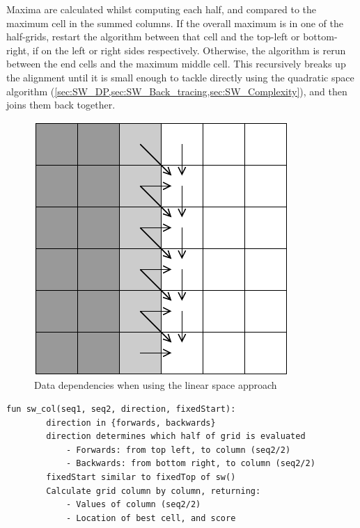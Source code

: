 Maxima are calculated whilst computing each half, and compared to the maximum cell in the summed columns.
If the overall maximum is in one of the half-grids, restart the algorithm between that cell and the top-left or bottom-right, if on the left or right sides respectively.
Otherwise, the algorithm is rerun between the end cells and the maximum middle cell.
This recursively breaks up the alignment until it is small enough to tackle directly using the quadratic space algorithm (\cref{sec:SW_DP,sec:SW_Back_tracing,sec:SW_Complexity}), and then joins them back together.
\begin{figure}[h]
    \centering
    \includegraphics[width=(0.4\textwidth)]{figs/linear_space_deps.pdf}
    \caption{Data dependencies when using the linear space approach}
    \label{fig:Linear_Space_Dependencies}
\end{figure}
\begin{lstlisting}[basicstyle=\ttfamily\linespread{0.9}\footnotesize, label={lst:pseudo_sw_col},captionpos=b,caption={Pseudo-code representation of linear space algorithm which finds middle columns}]
    fun sw_col(seq1, seq2, direction, fixedStart):
        direction in {forwards, backwards}
        direction determines which half of grid is evaluated
            - Forwards: from top left, to column (seq2/2)
            - Backwards: from bottom right, to column (seq2/2)
        fixedStart similar to fixedTop of sw()
        Calculate grid column by column, returning:
            - Values of column (seq2/2)
            - Location of best cell, and score
    \end{lstlisting}
